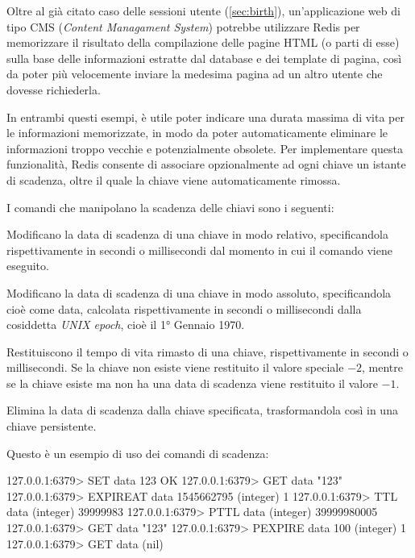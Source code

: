 Oltre al già citato caso delle sessioni utente (\autoref{sec:birth}), un'applicazione web di tipo CMS
(\emph{Content Managament System}) potrebbe utilizzare Redis per memorizzare il risultato della
compilazione delle pagine HTML (o parti di esse) sulla base delle informazioni estratte dal database
e dei template di pagina, così da poter più velocemente inviare la medesima pagina ad un altro
utente che dovesse richiederla.

In entrambi questi esempi, è utile poter indicare una durata massima di vita per le informazioni
memorizzate, in modo da poter automaticamente eliminare le informazioni troppo vecchie e
potenzialmente obsolete. Per implementare questa funzionalità, Redis consente di associare
opzionalmente ad ogni chiave un istante di scadenza, oltre il quale la chiave viene automaticamente
rimossa.

I comandi che manipolano la scadenza delle chiavi sono i seguenti:

\begin{description}[style=nextline,font={\bfseries\ttfamily}]
	\item[EXPIRE / PEXPIRE] Modificano la data di scadenza di una chiave in modo relativo,
		specificandola rispettivamente in secondi o millisecondi dal momento in cui il comando viene
		eseguito.
	\item[EXPIREAT / PEXPIREAT] Modificano la data di scadenza di una chiave in modo assoluto,
		specificandola cioè come data, calcolata rispettivamente in secondi o millisecondi dalla
		cosiddetta \emph{UNIX epoch}, cioè il 1° Gennaio 1970.
	\item[TTL / PTTL] Restituiscono il tempo di vita rimasto di una chiave, rispettivamente in
		secondi o millisecondi. Se la chiave non esiste viene restituito il valore speciale $-2$,
		mentre se la chiave esiste ma non ha una data di scadenza viene restituito il valore $-1$.
	\item[PERSIST] Elimina la data di scadenza dalla chiave specificata, trasformandola così in una
		chiave persistente.
\end{description}

Questo è un esempio di uso dei comandi di scadenza:

\begin{commentedsource}[style=redis]
127.0.0.1:6379> SET data 123
OK
127.0.0.1:6379> GET data
"123"
127.0.0.1:6379> EXPIREAT data 1545662795
(integer) 1
127.0.0.1:6379> TTL data
(integer) 39999983
127.0.0.1:6379> PTTL data
(integer) 39999980005
127.0.0.1:6379> GET data
"123"
127.0.0.1:6379> PEXPIRE data 100
(integer) 1
127.0.0.1:6379> GET data
(nil)
\end{commentedsource}

